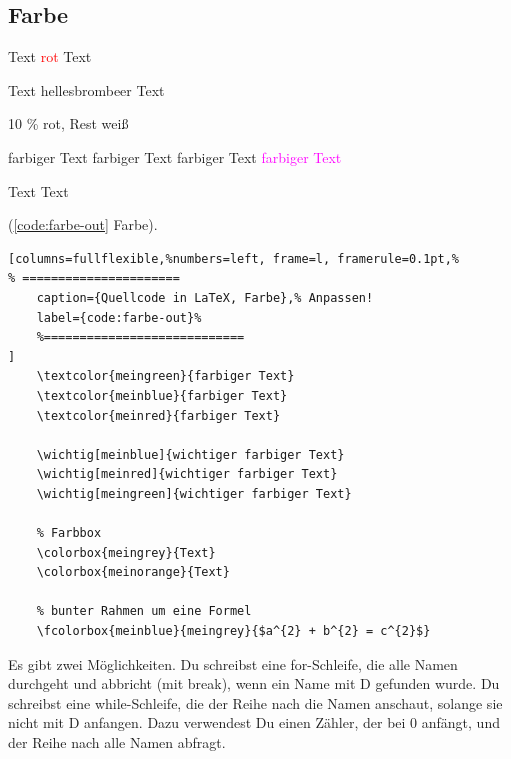 \newpage

\subsection{Farbe}

Text \textcolor{red}{rot} Text

Text \colorbox{hellesbrombeer}{hellesbrombeer} Text

\colorbox{red!10!white}{10 \% rot, Rest weiß}

\textcolor{meinorange}{farbiger Text}
\textcolor{meinblue}{farbiger Text}
\textcolor{meinred}{farbiger Text}
\textcolor{magenta}{farbiger Text}


\colorbox{meingrey}{Text}
\colorbox{meinorange}{Text}


(\autoref{code:farbe-out} Farbe).
\lstset{language=[LaTeX]TeX} %
\begin{lstlisting}[columns=fullflexible,%numbers=left, frame=l, framerule=0.1pt,%
% ======================
	caption={Quellcode in LaTeX, Farbe},% Anpassen!
	label={code:farbe-out}%
	%============================
]
	\textcolor{meingreen}{farbiger Text}
	\textcolor{meinblue}{farbiger Text}
	\textcolor{meinred}{farbiger Text}

	\wichtig[meinblue]{wichtiger farbiger Text}
	\wichtig[meinred]{wichtiger farbiger Text}
	\wichtig[meingreen]{wichtiger farbiger Text}

	% Farbbox
	\colorbox{meingrey}{Text}
	\colorbox{meinorange}{Text}

	% bunter Rahmen um eine Formel
	\fcolorbox{meinblue}{meingrey}{$a^{2} + b^{2} = c^{2}$}
\end{lstlisting}

\begin{hinweis}
 Es gibt zwei Möglichkeiten.
 Du schreibst eine for-Schleife, die alle Namen durchgeht und
 abbricht (mit break), wenn ein Name mit D gefunden wurde.
 Du schreibst eine while-Schleife, die der Reihe nach die Namen anschaut,
 solange sie nicht mit D anfangen. Dazu verwendest Du einen Zähler,
 der bei 0 anfängt, und der Reihe nach alle Namen abfragt.
\end{hinweis}

